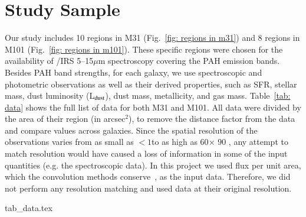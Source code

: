 \section{Study Sample}
\label{Sec: data_SOMN}

Our study includes 10 regions in M31 (Fig.~\ref{fig: regions in m31}) and 8 regions in M101 (Fig.~\ref{fig: regions in m101}). 
These specific regions were chosen for the availability of \Spitzer/IRS 5--15$\mu$m  spectroscopy covering the PAH emission bands.
Besides PAH band strengths, for each galaxy, we use spectroscopic and photometric observations as well as their derived properties, such as SFR, stellar mass, dust luminosity (L$_{\rm dust}$), dust mass, metallicity, and gas mass.
Table~\ref{tab: data} shows the full list of data for both M31 and M101.
All data were divided by the area of their region (in arcsec$^2$), to remove the distance factor from the data and compare values across galaxies.
Since the spatial resolution of the observations varies from as small as $<1$\arcsec to as high as 60\arcsec $\times$ 90 \arcsec, any attempt to match resolution would have caused a loss of information in some of the input quantities (e.g. the spectroscopic data).
In this project we used flux per unit area, which the convolution methods conserve~\citep{Aniano12}, as the input data.
Therefore, we did not perform any resolution matching and used data at their original resolution.

    {tab_data.tex}

